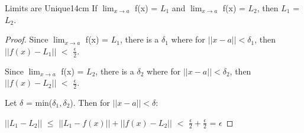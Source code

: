     \vspace{0.5cm}



    \begin{wtheorem}{Limits are Unique}{14cm}
        If $\lim_{x \rightarrow a}$ f(x) = $L_1$
        and $\lim_{x \rightarrow a}$ f(x) = $L_2$, then $L_1$ = $L_2$.
    \end{wtheorem}

    \begin{proof}
        Since $\lim_{x \rightarrow a}$ f(x) = $L_1$, there is a $\delta_1$
        where for $||x-a|| < \delta_1$, then
        $||f(x) - L_1||$ $<$ $\frac{\epsilon}{2}$.

        Since $\lim_{x \rightarrow a}$ f(x) = $L_2$, there is a $\delta_2$
        where for $||x-a|| < \delta_2$, then
        $||f(x) - L_2||$ $<$ $\frac{\epsilon}{2}$.

        Let $\delta$ = min($\delta_1,\delta_2$).
        Then for $||x-a|| < \delta$:

        \hspace{0.5cm}
        $||L_1 - L_2||$
        $\leq$ $||L_1 - f(x)|| + ||f(x) - L_2||$
        $<$ $\frac{\epsilon}{2} + \frac{\epsilon}{2}$
        = $\epsilon$
    \end{proof}

    \vspace{0.5cm}



